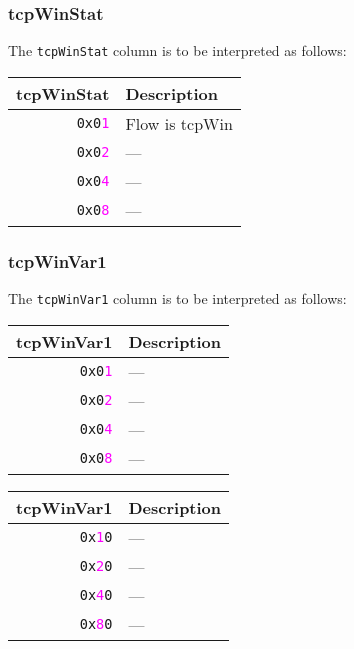 \documentclass[documentation]{subfiles}
\begin{document}
\subsubsection{tcpWinStat}\label{tcpWinStat}
The {\tt tcpWinStat} column is to be interpreted as follows:
\begin{longtable}{rl}
    \toprule
    {\bf tcpWinStat} & {\bf Description}\\
    \midrule\endhead%
    {\tt 0x0\textcolor{magenta}{1}} & Flow is tcpWin\\
    {\tt 0x0\textcolor{magenta}{2}} & ---\\
    {\tt 0x0\textcolor{magenta}{4}} & ---\\
    {\tt 0x0\textcolor{magenta}{8}} & ---\\
    \bottomrule
\end{longtable}

\subsubsection{tcpWinVar1}\label{tcpWinVar1}
The {\tt tcpWinVar1} column is to be interpreted as follows:\\
\begin{minipage}{.45\textwidth}
    \begin{longtable}{rl}
        \toprule
        {\bf tcpWinVar1} & {\bf Description}\\
        \midrule\endhead%
        {\tt 0x0\textcolor{magenta}{1}} & ---\\
        {\tt 0x0\textcolor{magenta}{2}} & ---\\
        {\tt 0x0\textcolor{magenta}{4}} & ---\\
        {\tt 0x0\textcolor{magenta}{8}} & ---\\
        \bottomrule
    \end{longtable}
\end{minipage}
\hfill
\begin{minipage}{.45\textwidth}
    \begin{longtable}{rl}
        \toprule
        {\bf tcpWinVar1} & {\bf Description}\\
        \midrule\endhead%
        {\tt 0x\textcolor{magenta}{1}0} & ---\\
        {\tt 0x\textcolor{magenta}{2}0} & ---\\
        {\tt 0x\textcolor{magenta}{4}0} & ---\\
        {\tt 0x\textcolor{magenta}{8}0} & ---\\
        \bottomrule
    \end{longtable}
\end{minipage}
\end{document}
